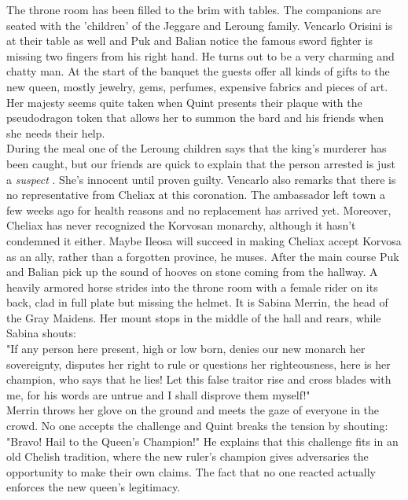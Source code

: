 The throne room has been filled to the brim with tables. The companions are seated with the 'children' of the Jeggare and Leroung family. Vencarlo Orisini is at their table as well and Puk and Balian notice the famous sword fighter is missing two fingers from his right hand. He turns out to be a very charming and chatty man. At the start of the banquet the guests offer all kinds of gifts to the new queen, mostly jewelry, gems, perfumes, expensive fabrics and pieces of art. Her majesty seems quite taken when Quint presents their plaque with the pseudodragon token that allows her to summon the bard and his friends when she needs their help.\\

During the meal one of the Leroung children says that the king's murderer has been caught, but our friends are quick to explain that the person arrested is just a {\itshape suspect} . She's innocent until proven guilty. Vencarlo also remarks that there is no representative from Cheliax at this coronation. The ambassador left town a few weeks ago for health reasons and no replacement has arrived yet. Moreover, Cheliax has never recognized the Korvosan monarchy, although it hasn't condemned it either. Maybe Ileosa will succeed in making Cheliax accept Korvosa as an ally, rather than a forgotten province, he muses. After the main course Puk and Balian pick up the sound of hooves on stone coming from the hallway. A heavily armored horse strides into the throne room with a female rider on its back, clad in full plate but missing the helmet. It is Sabina Merrin, the head of the Gray Maidens. Her mount stops in the middle of the hall and rears, while Sabina shouts:\\

"If any person here present, high or low born, denies our new monarch her sovereignty, disputes her right to rule or questions her righteousness, here is her champion, who says that he lies! Let this false traitor rise and cross blades with me, for his words are untrue and I shall disprove them myself!"\\

Merrin throws her glove on the ground and meets the gaze of everyone in the crowd. No one accepts the challenge and Quint breaks the tension by shouting: "Bravo! Hail to the Queen's Champion!" He explains that this challenge fits in an old Chelish tradition, where the new ruler's champion gives adversaries the opportunity to make their own claims. The fact that no one reacted actually enforces the new queen's legitimacy.\\

